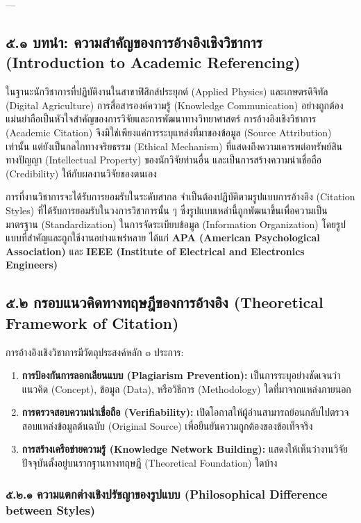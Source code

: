 \documentclass[11pt,a4paper,openany]{report}
\begin{document}
---

\subsection{๕.๑ บทนำ: ความสำคัญของการอ้างอิงเชิงวิชาการ (Introduction to Academic Referencing)}


ในฐานะนักวิชาการที่ปฏิบัติงานในสาขาฟิสิกส์ประยุกต์ (Applied Physics) และเกษตรดิจิทัล (Digital Agriculture) การสื่อสารองค์ความรู้ (Knowledge Communication) อย่างถูกต้องแม่นยำถือเป็นหัวใจสำคัญของการวิจัยและการพัฒนาทางวิทยาศาสตร์ การอ้างอิงเชิงวิชาการ (Academic Citation) จึงมิใช่เพียงแค่การระบุแหล่งที่มาของข้อมูล (Source Attribution) เท่านั้น แต่ยังเป็นกลไกทางจริยธรรม (Ethical Mechanism) ที่แสดงถึงความเคารพต่อทรัพย์สินทางปัญญา (Intellectual Property) ของนักวิจัยท่านอื่น และเป็นการสร้างความน่าเชื่อถือ (Credibility) ให้กับผลงานวิจัยของตนเอง

การที่งานวิชาการจะได้รับการยอมรับในระดับสากล จำเป็นต้องปฏิบัติตามรูปแบบการอ้างอิง (Citation Styles) ที่ได้รับการยอมรับในวงการวิชาการนั้น ๆ ซึ่งรูปแบบเหล่านี้ถูกพัฒนาขึ้นเพื่อความเป็นมาตรฐาน (Standardization) ในการจัดระเบียบข้อมูล (Information Organization) โดยรูปแบบที่สำคัญและถูกใช้งานอย่างแพร่หลาย ได้แก่ \textbf{APA (American Psychological Association)} และ \textbf{IEEE (Institute of Electrical and Electronics Engineers)}

\subsection{๕.๒ กรอบแนวคิดทางทฤษฎีของการอ้างอิง (Theoretical Framework of Citation)}


การอ้างอิงเชิงวิชาการมีวัตถุประสงค์หลัก ๓ ประการ:

\begin{enumerate}
  \item \textbf{การป้องกันการลอกเลียนแบบ (Plagiarism Prevention):} เป็นการระบุอย่างชัดเจนว่าแนวคิด (Concept), ข้อมูล (Data), หรือวิธีการ (Methodology) ใดที่มาจากแหล่งภายนอก
  \item \textbf{การตรวจสอบความน่าเชื่อถือ (Verifiability):} เปิดโอกาสให้ผู้อ่านสามารถย้อนกลับไปตรวจสอบแหล่งข้อมูลต้นฉบับ (Original Source) เพื่อยืนยันความถูกต้องของข้อเท็จจริง
  \item \textbf{การสร้างเครือข่ายความรู้ (Knowledge Network Building):} แสดงให้เห็นว่างานวิจัยปัจจุบันตั้งอยู่บนรากฐานทางทฤษฎี (Theoretical Foundation) ใดบ้าง
\end{enumerate}


\subsubsection{๕.๒.๑ ความแตกต่างเชิงปรัชญาของรูปแบบ (Philosophical Difference between Styles)}
\end{document}
